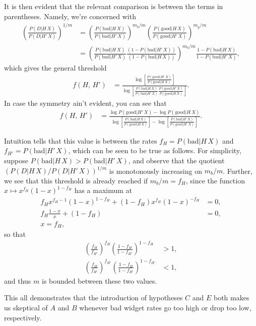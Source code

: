 \documentclass{article}
\begin{document}
It is then evident that the relevant comparison is between the terms in parentheses. Namely, we're concerned with
\begin{align*}
	\left(\frac{P(D|H\,X)}{P(D|H'\,X)}\right)^{1/m}&=\left(\frac{P(\text{bad}|H\,X)}{P(\text{bad}|H'\,X)}\right)^{m_b/m}\left(\frac{P(\text{good}|H\,X)}{P(\text{good}|H'\,X)}\right)^{m_g/m}\\
	&=\left(\frac{P(\text{bad}|H\,X)}{P(\text{bad}|H'\,X)}\frac{(1-P(\text{bad}|H'\,X))}{(1-P(\text{bad}|H\,X))}\right)^{m_b/m}\frac{1-P(\text{bad}|H\,X)}{1-P(\text{bad}|H'\,X)},
\end{align*}
which gives the general threshold
\begin{align*}
	f(H,\,H')&=\frac{\log\left[\frac{P(\text{good}|H'\,X)}{P(\text{good}|H\,X)}\right]}{\log\left[\frac{P(\text{bad}|H\,X)}{P(\text{bad}|H'\,X)}\frac{P(\text{good}|H'\,X)}{P(\text{good}|H\,X)}\right]}.
\end{align*}
In case the symmetry ain't evident, you can see that
\begin{align*}
	f(H,\,H')&=\frac{\log P(\text{good}|H'\,X)-\log P(\text{good}|H\,X)}{\log\left[\frac{P(\text{bad}|H\,X)}{P(\text{good}|H\,X)}\right]-\log\left[\frac{P(\text{bad}|H'\,X)}{P(\text{good}|H'\,X)}\right]}.
\end{align*}

Intuition tells that this value is between the rates $f_H=P(\text{bad}|H\,X)$ and $f_{H'}=P(\text{bad}|H'\,X)$, which can be seen to be true as follows. For simplicity, suppose $P(\text{bad}|H\,X)>P(\text{bad}|H'\,X)$, and observe that the quotient $\left(P(D|H\,X)/P(D|H'\,X)\right)^{1/m}$ is monotonously increasing on $m_b/m$. Further, we see that this threshold is already reached if $m_b/m=f_H$, since the function $x\mapsto x^{f_H}(1-x)^{1-f_H}$ has a maximum at
\begin{align*}
	f_Hx^{f_H-1}(1-x)^{1-f_H}+(1-f_H)x^{f_H}(1-x)^{-f_H}&=0,\\
	f_H\frac{1-x}{x}+(1-f_H)&=0,\\
	x=f_H,
\end{align*}
so that
\begin{align*}
	\left(\frac{f_H}{f_{H'}}\right)^{f_H}\left(\frac{1-f_H}{1-f_{H'}}\right)^{1-f_H}&>1,\\
	\left(\frac{f_H}{f_{H'}}\right)^{f_{H'}}\left(\frac{1-f_H}{1-f_{H'}}\right)^{1-f_{H'}}&<1,
\end{align*}
and thus $m$ is bounded between these two values.

This all demonstrates that the introduction of hypotheses $C$ and $E$ both makes us skeptical of $A$ and $B$ whenever bad widget rates go too high or drop too low, respectively.
\end{document}
